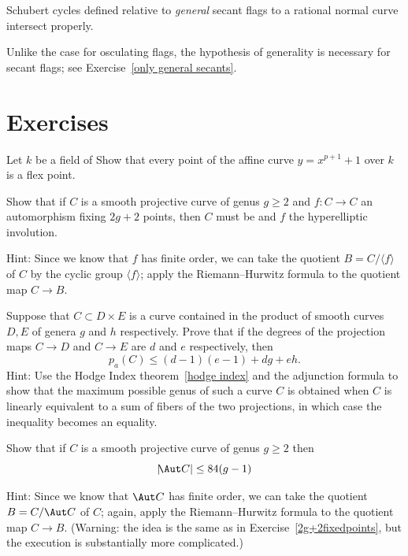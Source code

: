 \begin{corollary}\label{secant schubert proper}
Schubert cycles defined relative to \emph{general} secant flags to a
rational normal curve intersect properly.
\end{corollary}

Unlike the case for osculating flags, the hypothesis of generality is
necessary for secant flags; see Exercise~\ref{only general secants}.

\section{Exercises}
\begin{exercise}\label{inseparable Gauss}
Let $k$ be a field of 
%
Show that every point of the
affine curve $y = x^{p+1}+1$ over $k$ is a flex point.
\end{exercise}

\begin{exercise}\label{2g+2fixedpoints}
Show that if $C$ is a smooth projective curve of genus $g \geq 2$ and
$f : C \to C$ an automorphism fixing $2g+2$ points, then $C$ must be
%
and $f$ the hyperelliptic involution.

Hint: Since we know that $f$ has finite order, we can take the quotient
$B = C/\langle f \rangle$ of $C$ by the cyclic group $\langle f \rangle$;
apply 
the Riemann--Hurwitz formula
%
to the quotient map $C \to B$.
\end{exercise}

\begin{exercise}\label{curve in a product}
Suppose that $C\subset D\times E$ is a curve contained in the product
of smooth curves $D,E$ of genera $g$ and $h$ respectively.
Prove that if the degrees of the projection maps $C \to D$ and $C\to E$
are $d$ and $e$ respectively,
then
$$
p_a(C)\leq (d-1)(e-1) +dg+eh.
$$
Hint:  Use the Hodge Index theorem~\ref{hodge index} and the adjunction
formula to show that the maximum possible genus of such
a curve $C$ is obtained when $C$ is linearly equivalent to a sum of
fibers of the two projections, in which case the inequality
becomes an equality.
\end{exercise}

\begin{exercise}\label{84(g-1)}
Show that if $C$ is a smooth projective curve of genus $g \geq 2$ then
$$
|\!\Aut C| \leq 84(g-1)
$$

Hint: Since we know that $\Aut C$ has finite order, we can take
the quotient $B = C/\Aut C$ of $C$; again, apply 
the Riemann--Hurwitz formula
%
to the quotient map $C \to B$. (Warning: the idea is the same as in
Exercise~\ref{2g+2fixedpoints}, but the execution is substantially
more complicated.)
\end{exercise}



